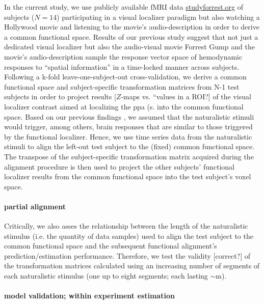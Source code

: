 In the current study, we use publicly available fMRI data
\href{www.studyforrest.org}{studyforrest.org} of subjects ($N=14$) participating
in a visual localizer paradigm \citep{sengupta2016extension} but also watching a
Hollywood \citep{hanke2016simultaneous} movie and listening to the movie's
audio-description \citep{hanke2014audiomovie} in order to derive a common
functional space.
%
Results of our previous study suggest \citep{haeusler2022processing} that not
just a dedicated visual localizer but also the audio-visual movie Forrest Gump
and the movie's audio-description sample the response vector space of
hemodynamic responses to ``spatial information'' in a time-locked manner across
subjects.
%
Following a k-fold leave-one-subject-out cross-validation, we derive a common
functional space and subject-specific transformation matrices from N-1 test
subjects in order to project results [$Z$-maps vs. ``values in a ROI?] of the
visual localizer contrast aimed at localizing the \ac{ppa} (s.
\citet{sengupta2016extension} into the common functional space.
Based on our previous findings \citep{haeusler2022processing}, we assumed that
the naturalistic stimuli would trigger, among others, brain responses that are
similar to those triggered by the functional localizer.
%
Hence, we use time series data from the naturalistic stimuli to align the
left-out test subject to the (fixed) common functional space.
The transpose of the subject-specific transformation matrix acquired during the
alignment procedure is then used to project the other subjects' functional
localizer results from the common functional space into the test subject's voxel
space.


\paragraph{partial alignment}

%
Critically, we also asses the relationship between the length of the
naturalistic stimulus (i.e. the quantity of data samples) used to align the test
subject to the common functional space and the subsequent functional alignment's
prediction/estimation performance.
%
Therefore, we test the validity [correct?] of the transformation matrices
calculated using an increasing number of segments of each naturalistic stimulus
(one up to eight segments; each lasting $\sim$\unit[15]{m}).


\paragraph{model validation; within experiment estimation}

